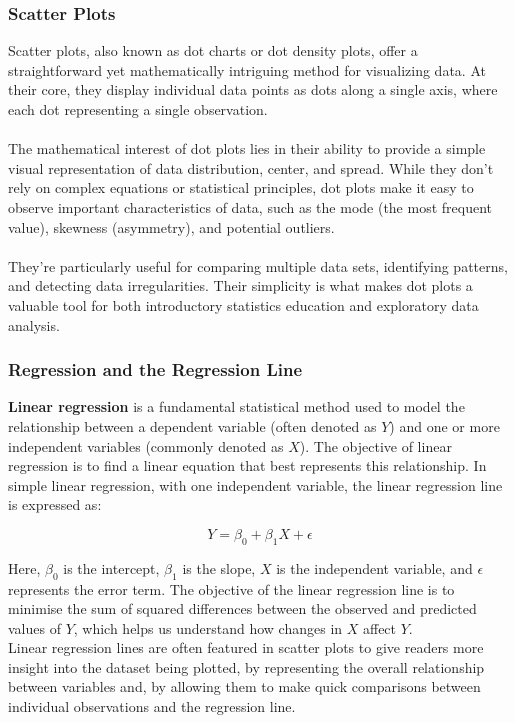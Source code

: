 \documentclass{article}\usepackage[]{graphicx}\usepackage[]{xcolor}
\begin{document}
\subsubsection{Scatter Plots}
Scatter plots, also known as dot charts or dot density plots, offer a straightforward yet mathematically intriguing method for visualizing data. At their core, they display individual data points as dots along a single axis, where each dot representing a single observation.\\ 
\\The mathematical interest of dot plots lies in their ability to provide a simple visual representation of data distribution, center, and spread. While they don't rely on complex equations or statistical principles, dot plots make it easy to observe important characteristics of data, such as the mode (the most frequent value), skewness (asymmetry), and potential outliers. \\ 
\\They're particularly useful for comparing multiple data sets, identifying patterns, and detecting data irregularities. Their simplicity is what makes dot plots a valuable tool for both introductory statistics education and exploratory data analysis.

\subsubsection{Regression and the Regression Line}
\textbf{Linear regression} is a fundamental statistical method used to model the relationship between a dependent variable (often denoted as \(Y\)) and one or more independent variables (commonly denoted as \(X\)). The objective of linear regression is to find a linear equation that best represents this relationship. In simple linear regression, with one independent variable, the linear regression line is expressed as:

\[
Y = \beta_0 + \beta_1X + \epsilon
\]

Here, \(\beta_0\) is the intercept, \(\beta_1\) is the slope, \(X\) is the independent variable, and \(\epsilon\) represents the error term. The objective of the linear regression line is to minimise the sum of squared differences between the observed and predicted values of \(Y\), which helps us understand how changes in \(X\) affect \(Y\).\\
Linear regression lines are often featured in scatter plots to give readers more insight into the dataset being plotted, by representing the overall relationship between variables and, by allowing them to make quick comparisons between individual observations and the regression line.\\
\end{document}
